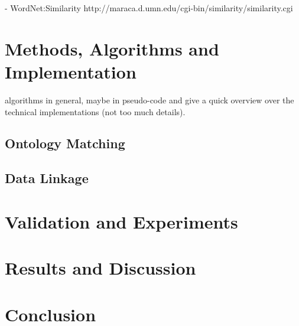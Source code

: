 \documentclass[runningheads,a4paper]{../../StyleFiles/llncs}
\begin{document}
- WordNet:Similarity http://maraca.d.umn.edu/cgi-bin/similarity/similarity.cgi

\section{Methods, Algorithms and Implementation}
 algorithms in general, maybe in pseudo-code and give a quick overview over the technical implementations (not too much details).

\subsection{Ontology Matching}
\subsection{Data Linkage}

\section{Validation and Experiments}

\section{Results and Discussion}


\section{Conclusion}



\end{document}
